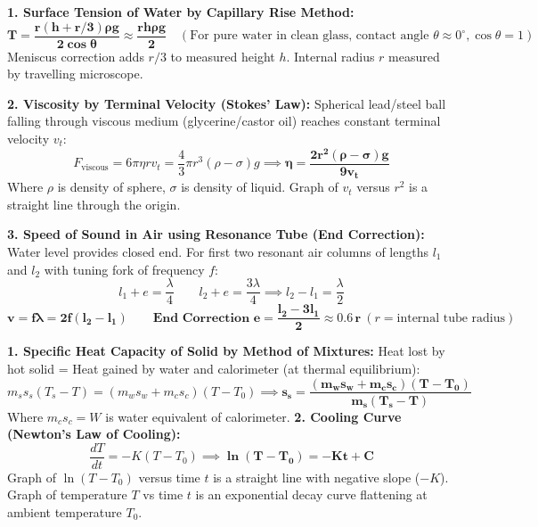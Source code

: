 \documentclass[10pt,a4paper]{article}
\begin{document}
\begin{conceptbox}
\textbf{1. Surface Tension of Water by Capillary Rise Method:}
\begin{equation}
  \mathbf{T = \frac{r (h + r/3) \rho g}{2 \cos\theta}} \approx \mathbf{\frac{r h \rho g}{2}} \quad (\text{For pure water in clean glass, contact angle } \theta \approx 0^\circ, \cos\theta = 1)
\end{equation}
Meniscus correction adds $r/3$ to measured height $h$. Internal radius $r$ measured by travelling microscope.

\textbf{2. Viscosity by Terminal Velocity (Stokes' Law):}
Spherical lead/steel ball falling through viscous medium (glycerine/castor oil) reaches constant terminal velocity $v_t$:
\begin{equation}
  F_{\mathrm{viscous}} = 6\pi \eta r v_t = \frac{4}{3}\pi r^3 (\rho - \sigma) g \implies \mathbf{\eta = \frac{2 r^2 (\rho - \sigma) g}{9 v_t}}
\end{equation}
Where $\rho$ is density of sphere, $\sigma$ is density of liquid. Graph of $v_t$ versus $r^2$ is a straight line through the origin.

\textbf{3. Speed of Sound in Air using Resonance Tube (End Correction):}
Water level provides closed end. For first two resonant air columns of lengths $l_1$ and $l_2$ with tuning fork of frequency $f$:
\begin{equation}
  l_1 + e = \frac{\lambda}{4} \qquad l_2 + e = \frac{3\lambda}{4} \implies l_2 - l_1 = \frac{\lambda}{2}
\end{equation}
\begin{equation}
  \mathbf{v = f \lambda = 2 f (l_2 - l_1)} \qquad \mathbf{\text{End Correction } e = \frac{l_2 - 3l_1}{2} \approx 0.6\,r} \ (r = \text{internal tube radius})
\end{equation}
\end{conceptbox}

\begin{formulabox}
\textbf{1. Specific Heat Capacity of Solid by Method of Mixtures:}
Heat lost by hot solid = Heat gained by water and calorimeter (at thermal equilibrium):
\begin{equation}
  m_s s_s (T_s - T) = (m_w s_w + m_c s_c)(T - T_0) \implies \mathbf{s_s = \frac{(m_w s_w + m_c s_c)(T - T_0)}{m_s (T_s - T)}}
\end{equation}
Where $m_c s_c = W$ is water equivalent of calorimeter.
\textbf{2. Cooling Curve (Newton's Law of Cooling):}
\begin{equation}
  \frac{dT}{dt} = -K (T - T_0) \implies \mathbf{\ln(T - T_0) = -K t + C}
\end{equation}
Graph of $\ln(T - T_0)$ versus time $t$ is a straight line with negative slope ($-K$). Graph of temperature $T$ vs time $t$ is an exponential decay curve flattening at ambient temperature $T_0$.
\end{formulabox}
\end{document}
